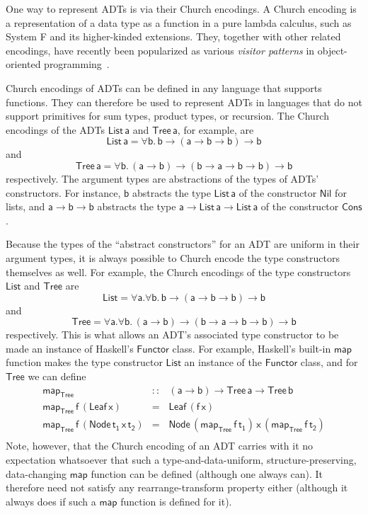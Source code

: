 \documentclass[acmsmall,screen,review,anonymous]{acmart}
\theoremstyle{definition}
\begin{document}
One way to represent ADTs is via their Church encodings. A Church
encoding is a representation of a data type as a function in a pure
lambda calculus, such as System F and its higher-kinded
extensions. They, together with other related encodings, have recently
been popularized as various {\em visitor patterns} in object-oriented
programming~\cite{owg08,gon21}.

Church encodings of ADTs can be defined in any language that supports
functions. They can therefore be used to represent ADTs in languages
that do not support primitives for sum types, product types, or
recursion. The Church encodings of the ADTs $\mathsf{List\,a}$ and
$\mathsf{Tree\,a}$, for example, are
\[\mathsf{List\,a} = \mathsf{\forall b.\,b \to (a \to b \to b) \to b}\]
and 
\[\mathsf{Tree\,a} = \mathsf{\forall b.\,(a \to b) \to (b \to a \to b
  \to b) \to b}\] respectively. The argument types are abstractions of
the types of ADTs' constructors. For instance, $\mathsf{b}$ abstracts
the type $\mathsf{List\,a}$ of the constructor $\mathsf{Nil}$ for
lists, and $\mathsf{a \to b \to b}$ abstracts the type $\mathsf{a \to
  List\,a \to List\,a}$ of the constructor $\mathsf{Cons}$.

Because the types of the ``abstract constructors'' for an ADT are
uniform in their argument types, it is always possible to Church
encode the type constructors themselves as well. For example, the
Church encodings of the type constructors $\mathsf{List}$ and
$\mathsf{Tree}$ are
\[\mathsf{List} = \mathsf{\forall a. \forall b.\,b \to (a \to b \to b)
  \to b}\] 
and 
\[\mathsf{Tree} = \mathsf{\forall a. \forall b.\,(a \to b) \to (b \to
  a \to b \to b) \to b}\] respectively. This is what allows an ADT's
associated type constructor to be made an instance of Haskell's
$\mathsf{Functor}$ class. For example, Haskell's built-in
$\mathsf{map}$ function makes the type constructor $\mathsf{List}$ an
instance of the $\mathsf{Functor}$ class, and for $\mathsf{Tree}$ we
can define
\[\begin{array}{lll}
\mathsf{map_{Tree}} & \mathsf{::} & \mathsf{(a \to b) \to Tree\,a \to Tree \,b}\\
\mathsf{map_{Tree}\, f\, (Leaf\,x)} & \mathsf{=} & \mathsf{Leaf\,(f\,x)}\\
\mathsf{map_{Tree}\, f\, (Node\,t_1\,x\,t_2)} & \mathsf{=} &
\mathsf{Node\,(map_{Tree}\, f \,t_1)\,x\,(map_{Tree}\,f\,t_2)}\\
\end{array}\]
Note, however, that the Church encoding of an ADT carries with it no
expectation whatsoever that such a type-and-data-uniform,
structure-preserving, data-changing $\mathsf{map}$ function can be
defined (although one always can). It therefore need not satisfy any
rearrange-transform property either (although it always does if such a
$\mathsf{map}$ function is defined for it).
\end{document}
